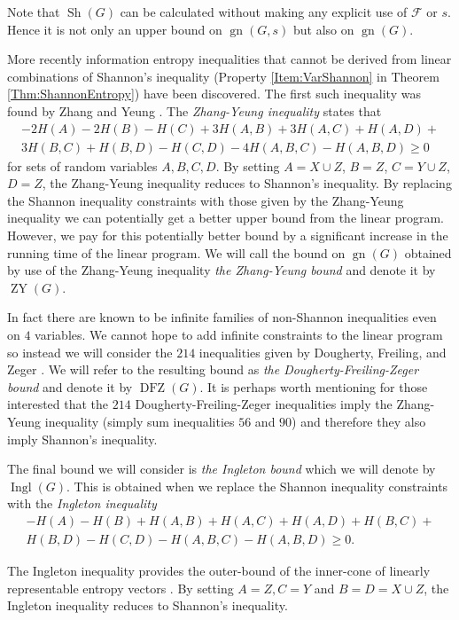 \documentclass[a4paper, 14pt]{extarticle}
\theoremstyle{plain}
\def\mc{\mathcal}
\DeclareMathOperator{\gn}{gn}
\DeclareMathOperator{\Sh}{Sh}
\DeclareMathOperator{\ZY}{ZY}
\DeclareMathOperator{\DFZ}{DFZ}
\DeclareMathOperator{\Ingl}{Ingl}
\begin{document}
Note that $\Sh(G)$ can be calculated without
making any explicit use of $\mc{F}$ or $s$. Hence it is not only an
upper bound on $\gn(G,s)$ but also on $\gn(G)$.

More recently information entropy inequalities that cannot be
derived from linear combinations of Shannon's inequality (Property
\ref{Item:VarShannon} in Theorem \ref{Thm:ShannonEntropy}) have been
discovered. The first such inequality was found by Zhang and Yeung \cite{Zheng&Yeung98}.
The \emph{Zhang-Yeung inequality} states that
\begin{multline*}
-2H(A)-2H(B)-H(C)+3H(A,B)+3H(A,C)+H(A,D)+\\3H(B,C)+H(B,D)-H(C,D)-4H(A,B,C)-H(A,B,D)
\geq 0
\end{multline*}
for sets of random variables $A,B,C,D$. By setting $A=X\cup Z$,
$B=Z$, $C=Y\cup Z$, $D=Z$, the Zhang-Yeung inequality reduces to
Shannon's inequality. By replacing the Shannon inequality
constraints with those given by the Zhang-Yeung inequality we can
potentially get a better upper bound from the linear program.
However, we pay for this potentially better bound by a significant
increase in the running time of the linear program. We will call the bound
on $\gn(G)$ obtained by use of the Zhang-Yeung inequality \emph{the
Zhang-Yeung bound} and denote it by $\ZY(G)$.

In fact there are known to be infinite families of non-Shannon
inequalities even on $4$ variables. We cannot hope to add infinite
constraints to the linear program so instead we will consider the
$214$ inequalities given by Dougherty, Freiling, and
Zeger \cite[Section VIII]{DFZ}. We will refer to the resulting bound as
\emph{the Dougherty-Freiling-Zeger bound} and denote it by $\DFZ(G)$. It is perhaps worth
mentioning for those interested that the $214$
Dougherty-Freiling-Zeger inequalities imply the Zhang-Yeung
inequality (simply sum inequalities $56$ and $90$) and therefore they
also imply Shannon's inequality.

The final bound we will consider is \emph{the Ingleton bound} which we will denote by $\Ingl(G)$. This is obtained when we replace the {S}hannon inequality constraints with the \emph{Ingleton inequality}
\begin{multline*}
-H(A)-H(B)+H(A,B)+H(A,C)+H(A,D)+H(B,C)+\\H(B,D)-H(C,D)-H(A,B,C)-H(A,B,D)\geq 0.
\end{multline*}

The Ingleton inequality provides the outer-bound of the inner-cone of linearly representable entropy vectors \cite{Chan07}. By setting $A=Z,C=Y$ and $B=D=X \cup Z$, the Ingleton inequality reduces to Shannon's inequality.
\end{document}
